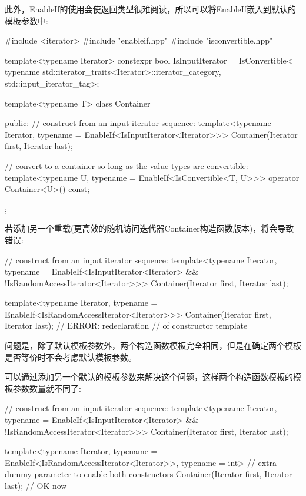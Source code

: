 此外，EnableIf的使用会使返回类型很难阅读，所以可以将EnableIf嵌入到默认的模板参数中:

\begin{cpp}
#include <iterator>
#include "enableif.hpp"
#include "isconvertible.hpp"

template<typename Iterator>
constexpr bool IsInputIterator =
	IsConvertible<
		typename std::iterator_traits<Iterator>::iterator_category,
		std::input_iterator_tag>;

template<typename T>
class Container {
	public:
	// construct from an input iterator sequence:
	template<typename Iterator,
			typename = EnableIf<IsInputIterator<Iterator>>>
	Container(Iterator first, Iterator last);
	
	// convert to a container so long as the value types are convertible:
	template<typename U, typename = EnableIf<IsConvertible<T, U>>>
	operator Container<U>() const;
};
\end{cpp}

若添加另一个重载(更高效的随机访问迭代器Container构造函数版本)，将会导致错误:

\begin{cpp}
// construct from an input iterator sequence:
template<typename Iterator,
		typename = EnableIf<IsInputIterator<Iterator> &&
							!IsRandomAccessIterator<Iterator>>>
Container(Iterator first, Iterator last);

template<typename Iterator,
		typename = EnableIf<IsRandomAccessIterator<Iterator>>>
Container(Iterator first, Iterator last); // ERROR: redeclaration
										  // of constructor template
\end{cpp}

问题是，除了默认模板参数外，两个构造函数模板完全相同，但是在确定两个模板是否等价时不会考虑默认模板参数。

可以通过添加另一个默认的模板参数来解决这个问题，这样两个构造函数模板的模板参数数量就不同了:

\begin{cpp}
// construct from an input iterator sequence:
template<typename Iterator,
		typename = EnableIf<IsInputIterator<Iterator> &&
							!IsRandomAccessIterator<Iterator>>>
Container(Iterator first, Iterator last);

template<typename Iterator,
		typename = EnableIf<IsRandomAccessIterator<Iterator>>,
		typename = int> // extra dummy parameter to enable both constructors
Container(Iterator first, Iterator last); // OK now
\end{cpp}

